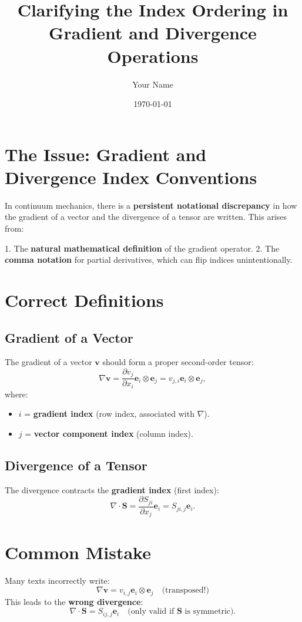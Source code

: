 \documentclass{article}
\title{Clarifying the Index Ordering in Gradient and Divergence Operations}
\author{Your Name}
\date{\today}
\begin{document}
\maketitle

\section*{The Issue: Gradient and Divergence Index Conventions}
In continuum mechanics, there is a \textbf{persistent notational discrepancy} in how the gradient of a vector and the divergence of a tensor are written. This arises from:

1. The \textbf{natural mathematical definition} of the gradient operator.
2. The \textbf{comma notation} for partial derivatives, which can flip indices unintentionally.

\section*{Correct Definitions}
\subsection*{Gradient of a Vector}
The gradient of a vector \(\mathbf{v}\) should form a proper second-order tensor:
\[
\nabla \mathbf{v} = \frac{\partial v_j}{\partial x_i} \mathbf{e}_i \otimes \mathbf{e}_j = v_{j,i} \mathbf{e}_i \otimes \mathbf{e}_j,
\]
where:
\begin{itemize}
    \item \(i\) = \textbf{gradient index} (row index, associated with \(\nabla\)).
    \item \(j\) = \textbf{vector component index} (column index).
\end{itemize}

\subsection*{Divergence of a Tensor}
The divergence contracts the \textbf{gradient index} (first index):
\[
\nabla \cdot \mathbf{S} = \frac{\partial S_{ji}}{\partial x_j} \mathbf{e}_i = S_{ji,j} \mathbf{e}_i.
\]

\section*{Common Mistake}
Many texts incorrectly write:
\[
\nabla \mathbf{v} = v_{i,j} \mathbf{e}_i \otimes \mathbf{e}_j \quad \text{(transposed!)}
\]
This leads to the \textbf{wrong divergence}:
\[
\nabla \cdot \mathbf{S} = S_{ij,j} \mathbf{e}_i \quad \text{(only valid if \(\mathbf{S}\) is symmetric)}.
\]
\end{document}
